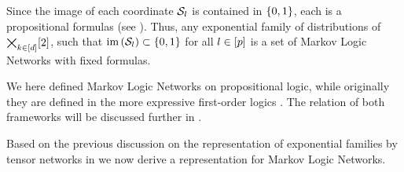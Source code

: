 Since the image of each coordinate $\mathcal{S}_{l}$ is contained in $\{0,1\}$, each is a propositional formulas (see ).
Thus, any exponential family of distributions of $\bigtimes_{k\in[d]}[2]$, such that $\mathrm{im}\left(\mathcal{S}_{l}\right)\subset\{0,1\}$ for all $l\in[p]$ is a set of Markov Logic Networks with fixed formulas.

\begin{remark}
    We here defined Markov Logic Networks on propositional logic, while originally they are defined in the more expressive first-order logics \cite{richardson_markov_2006}.
    The relation of both frameworks will be discussed further in .
\end{remark}




Based on the previous discussion on the representation of exponential families by tensor networks in  we now derive a representation for Markov Logic Networks.



